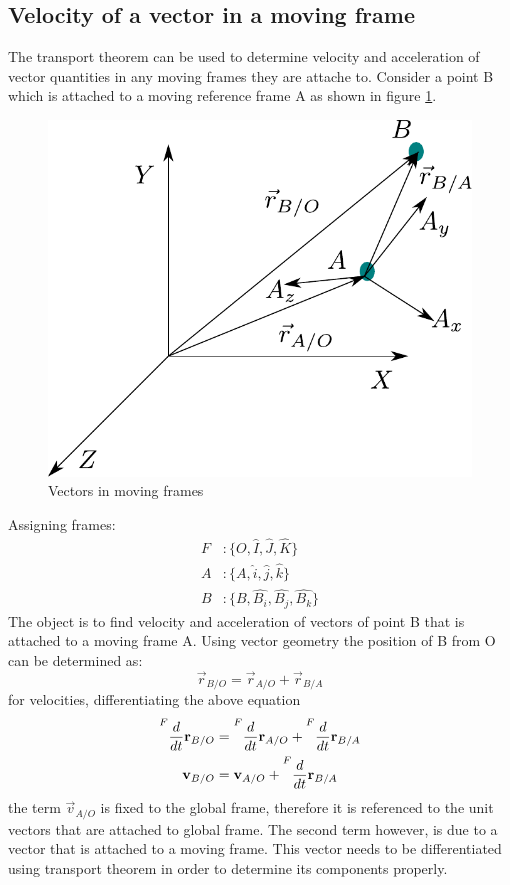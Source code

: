 \subsection{Velocity of a vector in a moving frame}

The transport theorem can be used to determine velocity and acceleration of vector quantities in any moving frames they are attache to. Consider a point B which is attached to a moving reference frame A as shown in figure \ref{Fig_0_ch_0_vecMovingFrames}.
\newpage
\begin{figure}[h!]
	\centering
	\includegraphics[width=0.55\linewidth]{Bilder/04_vel_acc_movingFrames.pdf}
	\caption{Vectors in moving frames}
	\label{Fig_0_ch_0_vecMovingFrames}
\end{figure}
Assigning frames:
\begin{align*}
	F &: \{ O, \hat{I}, \hat{J}, \hat{K} \}\\
	A &: \{A, \hat{i}, \hat{j}, \hat{k}\}	\\
	B &: \{B, \hat{B_i}, \hat{B_j}, \hat{B_k} \}
\end{align*}
The object is to find velocity and acceleration of vectors of point B that is attached to a moving frame A. Using vector geometry the position of B from O can be determined as:
\begin{equation}
	\vec{r}_{B/O} = \vec{r}_{A/O} + \vec{r}_{B/A}
\end{equation}
for velocities, differentiating the above equation
\begin{align*}
	\prescript{F}{}{\frac{d}{dt}\vec{r}_{B/O}} &= \prescript{F}{}{\frac{d}{dt}\vec{r}_{A/O}} + \prescript{F}{}{\frac{d}{dt}\vec{r}_{B/A}} \\
	\vec{v}_{B/O} &= \vec{v}_{A/O} + \prescript{F}{}{\frac{d}{dt}\vec{r}_{B/A}}
\end{align*}
the term $\vec{v}_{A/O}$ is fixed to the global frame, therefore it is referenced to the unit vectors that are attached to global frame. The second term however, is due to a vector that is attached to a moving frame. This vector needs to be differentiated using transport theorem in order to determine its components properly.

